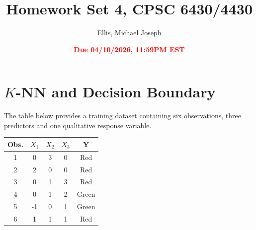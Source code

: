 \documentclass[11pt]{article}
\title{{\bf Homework Set 4, CPSC 6430/4430}}
\author{\Large\underline{Ellis, Michael Joseph}}
\date{\textbf{\Large\textcolor{red}{Due 04/10/2026, 11:59PM EST}}}
\newcommand{\R}{\mathbb{R}}
\newcommand{\minimize}{\operatorname*{minimize\ }}
\newcommand{\mtx}[1]{\mathbf{#1}}
\newcommand{\vct}[1]{\mathbf{#1}}
\def \mA {\mtx{A}}
\def \mI {\mtx{I}}
\def \mU {\mtx{U}}
\def \mX {\mtx{X}}
\def \mZ {\mtx{Z}}
\def \vv {\vct{v}}
\def \vx {\vct{x}}
\def \vy {\vct{y}}
\def \R {\mathbb{R}}
\begin{document}
\maketitle


\section*{$K$-NN and Decision Boundary }
The table below provides a training dataset containing six observations, three predictors and one qualitative response variable.

\vspace{.4cm}
{
\centering
\begin{tabular}{|c|c|c|c|c|}
	\hline
	Obs.& $X_1$ & $X_2$ & $X_3$ & Y \\
	\hline
	1&  0& 3 & 0 & Red \\
	\hline
	2& 2 & 0 &  0& Red \\
	\hline
	3&0  &1  & 3 & Red \\
	\hline
	4&  0& 1 & 2 & Green \\
	\hline
	5& -1 &0  &1  &Green  \\
	\hline
	6&  1& 1 &1  &  Red\\
	\hline
\end{tabular}\par
}
\vspace{.3cm}
\end{document}
